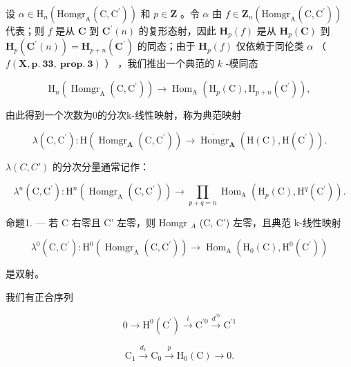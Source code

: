 设 \(\alpha\in\mathrm{H}_{n}(\mathrm{Homgr}_{\mathrm{A}}(\mathrm{C},\mathrm{C}^{\prime}))\) 和 \(p\in\mathbf{Z}\) 。令 \(\alpha\) 由 \(f\in\mathbf{Z}_{n}(\mathrm{Homgr}_{\mathrm{A}}(\mathrm{C},\mathrm{C}^{\prime}))\) 代表；则 \(f\) 是从 \(\mathbf{C}\) 到 \(\mathbf{C}^{\prime}(n)\) 的复形态射，因此 \(\mathbf{H}_{p}(f)\) 是从 \(\mathbf{H}_{p}(\mathbf{C})\) 到 \(\mathbf{H}_{p}(\mathbf{C}^{\prime}(n))=\mathbf{H}_{p+n}(\mathbf{C}^{\prime})\) 的同态；由于 \(\mathbf{H}_{p}(f)\) 仅依赖于同伦类 \(\alpha\) （ \(f(\mathbf{X},\mathbf{p.~33,~prop.~3})\) ） ，我们推出一个典范的 \(k\) -模同态

\[
\mathrm{H} _ {n} \left(\operatorname{Homgr} _ {\mathrm{A}} \left(\mathrm{C}, \mathrm{C} ^ {\prime}\right)\right)\rightarrow \operatorname{Hom} _ {\mathrm{A}} \left(\mathrm{H} _ {p} (\mathrm{C}), \mathrm{H} _ {p + n} \left(\mathrm{C} ^ {\prime}\right)\right),
\]

由此得到一个次数为0的分次k-线性映射，称为典范映射

\[
\lambda (\mathrm{C}, \mathrm{C} ^ {\prime}): \mathrm{H} (\operatorname{Homgr} _ {\mathbf {A}} (\mathrm{C}, \mathrm{C} ^ {\prime})) \rightarrow \dot {\operatorname{Homgr}} _ {\mathbf {A}} (\mathrm{H} (\mathrm{C}), \mathrm{H} (\mathrm{C} ^ {\prime})).
\]

\(\lambda(C, C')\) 的分次分量通常记作：

\[
\lambda^ {n} (\mathrm{C}, \mathrm{C} ^ {\prime}): \mathrm{H} ^ {n} \left(\operatorname{Homgr} _ {\mathrm{A}} \left(\mathrm{C}, \mathrm{C} ^ {\prime}\right)\right)\rightarrow \prod_ {p + q = n} \operatorname{Hom} _ {\mathrm{A}} \left(\mathrm{H} _ {p} (\mathrm{C}), \mathrm{H} ^ {q} \left(\mathrm{C} ^ {\prime}\right)\right).
\]

命题1. — 若 C 右零且 C' 左零，则 Homgr \(_{A}\) (C, C') 左零，且典范 k-线性映射

\[
\lambda^ {0} (\mathrm{C}, \mathrm{C} ^ {\prime}): \mathrm{H} ^ {0} \left(\operatorname{Homgr} _ {\mathrm{A}} (\mathrm{C}, \mathrm{C} ^ {\prime})\right)\rightarrow \operatorname{Hom} _ {\mathrm{A}} \left(\mathrm{H} _ {0} (\mathrm{C}), \mathrm{H} ^ {0} \left(\mathrm{C} ^ {\prime}\right)\right)
\]

是双射。

我们有正合序列

\[
0 \longrightarrow \mathrm{H} ^ {0} (\mathrm{C} ^ {\prime}) \stackrel {i} {\longrightarrow} \mathrm{C} ^ {\prime 0} \stackrel {d ^ {\prime 0}} {\longrightarrow} \mathrm{C} ^ {\prime 1}
\]

\[
\mathrm{C} _ {1} \xrightarrow {d _ {1}} \mathrm{C} _ {0} \xrightarrow {p} \mathrm{H} _ {0} (\mathrm{C}) \longrightarrow 0.
\]

